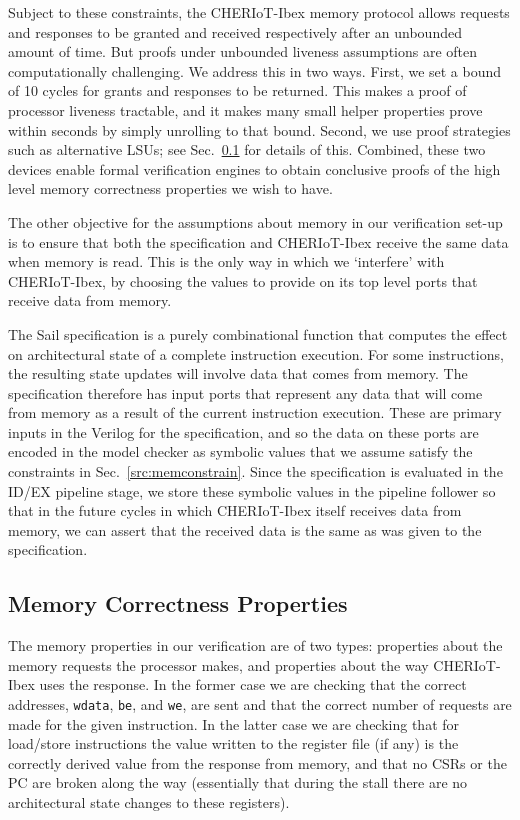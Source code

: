 \documentclass[10pt,conference]{IEEEtran}
\begin{document}
Subject to these constraints, the CHERIoT-Ibex memory protocol allows
requests and responses to be granted and received respectively after an
unbounded amount of time.  But proofs under unbounded liveness assumptions
are often computationally challenging. We address this in two ways. First,
we set a bound of 10 cycles for grants and responses to be returned.  This
makes a proof of processor liveness tractable, and it makes many small
helper properties prove within seconds by simply unrolling to that
bound. Second, we use proof strategies such as alternative LSUs; see
Sec.~\ref{src:memcorrectness} for details of this. Combined, these two
devices enable formal verification engines to obtain conclusive proofs of
the high level memory correctness properties we wish to have.

The other objective for the assumptions about memory in our verification
set-up is to ensure that both the specification and CHERIoT-Ibex receive
the same data when memory is read. This is the only way in which we
`interfere' with CHERIoT-Ibex, by choosing the values to provide on its top
level ports that receive data from memory.

The Sail specification is a purely combinational function that computes the
effect on architectural state of a complete instruction execution. For some
instructions, the resulting state updates will involve data that comes from
memory.  The specification therefore has input ports that represent any
data that will come from memory as a result of the current instruction
execution. These are primary inputs in the Verilog for the specification,
and so the data on these ports are encoded in the model checker as symbolic
values that we assume satisfy the constraints in
Sec.~\ref{src:memconstrain}.  Since the specification is evaluated in the
ID/EX pipeline stage, we store these symbolic values in the pipeline
follower so that in the future cycles in which CHERIoT-Ibex itself receives
data from memory, we can assert that the received data is the same as was
given to the specification.

\subsection{Memory Correctness Properties}\label{src:memcorrectness}

The memory properties in our verification are of two types: properties
about the memory requests the processor makes, and properties about the way
CHERIoT-Ibex uses the response. In the former case we are checking that
the correct addresses, \verb|wdata|, \verb|be|, and \verb|we|, are sent and
that the correct number of requests are made for the given instruction.
In the latter case we are checking that for load/store instructions the value
written to the register file (if any) is the correctly derived value from the response
from memory, and that no CSRs or the PC are broken along the way (essentially that
during the stall there are no architectural state changes to these registers).
\end{document}
